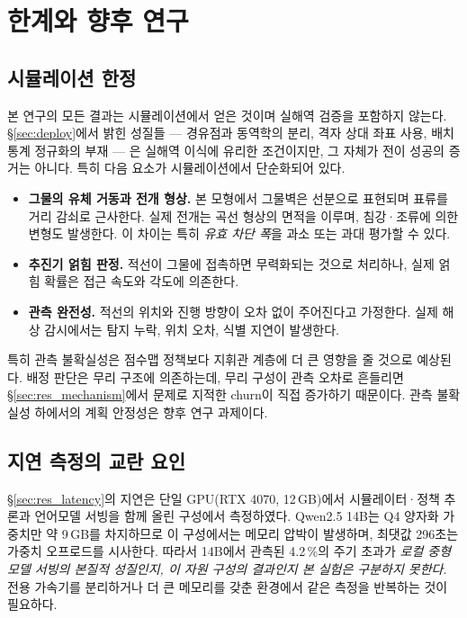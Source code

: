\section{한계와 향후 연구}
\label{sec:limitations}

\subsection{시뮬레이션 한정}

본 연구의 모든 결과는 시뮬레이션에서 얻은 것이며 실해역 검증을 포함하지 않는다.
\S\ref{sec:deploy}에서 밝힌 성질들 --- 경유점과 동역학의 분리, 격자 상대 좌표 사용, 배치
통계 정규화의 부재 --- 은 실해역 이식에 유리한 조건이지만, 그 자체가 전이 성공의 증거는
아니다. 특히 다음 요소가 시뮬레이션에서 단순화되어 있다.

\begin{itemize}[leftmargin=*, itemsep=2pt, topsep=3pt]
\item \textbf{그물의 유체 거동과 전개 형상.} 본 모형에서 그물벽은 선분으로 표현되며
      표류를 거리 감쇠로 근사한다. 실제 전개는 곡선 형상의 면적을 이루며, 침강·조류에 의한 변형도 발생한다. 이 차이는 특히
      \emph{유효 차단 폭}을 과소 또는 과대 평가할 수 있다.
\item \textbf{추진기 얽힘 판정.} 적선이 그물에 접촉하면 무력화되는 것으로 처리하나, 실제
      얽힘 확률은 접근 속도와 각도에 의존한다.
\item \textbf{관측 완전성.} 적선의 위치와 진행 방향이 오차 없이 주어진다고 가정한다. 실제
      해상 감시에서는 탐지 누락, 위치 오차, 식별 지연이 발생한다.
\end{itemize}

특히 관측 불확실성은 점수맵 정책보다 지휘관 계층에 더 큰 영향을 줄 것으로 예상된다. 배정
판단은 무리 구조에 의존하는데, 무리 구성이 관측 오차로 흔들리면 \S\ref{sec:res_mechanism}에서
문제로 지적한 churn이 직접 증가하기 때문이다. 관측 불확실성 하에서의 계획 안정성은 향후
연구 과제이다.

\subsection{지연 측정의 교란 요인}

\S\ref{sec:res_latency}의 지연은 단일 GPU(RTX 4070, 12\,GB)에서 시뮬레이터·정책 추론과
언어모델 서빙을 함께 올린 구성에서 측정하였다. Qwen2.5 14B는 Q4 양자화 가중치만 약 9\,GB를
차지하므로 이 구성에서는 메모리 압박이 발생하며, 최댓값 296초는 가중치 오프로드를 시사한다.
따라서 14B에서 관측된 4.2\,\%의 주기 초과가 \emph{로컬 중형 모델 서빙의 본질적 성질인지,
이 자원 구성의 결과인지 본 실험은 구분하지 못한다}. 전용 가속기를 분리하거나 더 큰 메모리를
갖춘 환경에서 같은 측정을 반복하는 것이 필요하다.

